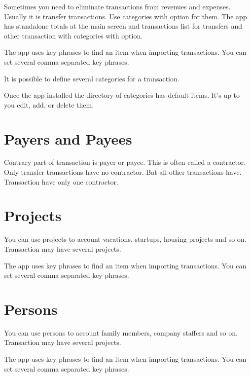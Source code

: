\documentclass[a4paper,10pt,english]{sphinxmanual}
\begin{document}
\sphinxAtStartPar
Sometimes you need to eliminate transactions from revenues and expenses. Usually it is
transfer transactions. Use categories with  option for them.
The app has standalone totals at the main screen and transactions list for transfers and other transaction with
categories with  option.

\sphinxAtStartPar
The app uses key phrases to find an item when importing transactions. You can set several
comma separated key phrases.

\sphinxAtStartPar
It is possible to define several categories for a transaction.

\sphinxAtStartPar
Once the app installed the directory of categories has default items. It’s up to you edit, add, or delete them.


\section{Payers and Payees}
\label{\detokenize{directories:payers-and-payees}}
\sphinxAtStartPar
Contrary part of transaction is payer or payee. This is often called a contractor. Only transfer transactions
have no contractor. Bat all other transactions have. Transaction have only one contractor.


\section{Projects}
\label{\detokenize{directories:projects}}
\sphinxAtStartPar
You can use projects to account vacations, startups, housing projects and so on.
Transaction may have several projects.

\sphinxAtStartPar
The app uses key phrases to find an item when importing transactions. You can set several
comma separated key phrases.


\section{Persons}
\label{\detokenize{directories:persons}}
\sphinxAtStartPar
You can use persons to account family members, company staffers and so on.
Transaction may have several projects.

\sphinxAtStartPar
The app uses key phrases to find an item when importing transactions. You can set several
comma separated key phrases.

\noindent{}
\end{document}

